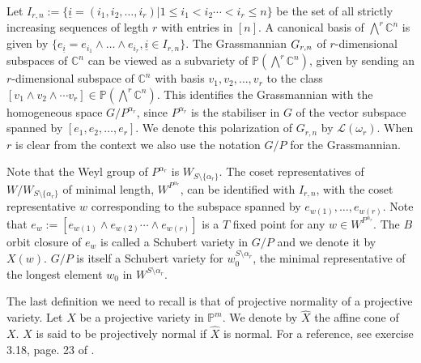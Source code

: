 Let $I_{r,n}:=\{{\underline{i}} =(i_1,i_2,\ldots,i_r) |  1\leq i_1 < i_2 \cdots < i_r \leq n \}$ be the set of all strictly increasing sequences of legth $r$ with entries in $[n]$. 
 A canonical basis of $\bigwedge^r{\mathbb C}^n$ is given by $\{e_{ \underline{i}} = e_{i_1} \wedge \ldots \wedge e_{i_r}, {\underline{i}} \in I_{r,n}\}$. The Grassmannian $G_{{r},{n}}$ of $r$-dimensional subspaces of ${\mathbb C}^n$ can be viewed as a subvariety of ${\mathbb P}(\bigwedge^r {\mathbb C}^n)$,
given by sending an $r$-dimensional
subspace of ${\mathbb C}^n$ with basis $v_1,v_2,\ldots,v_r$ to the class $[v_1 \wedge v_2 \wedge \cdots v_r] \in {\mathbb P}(\bigwedge^r {\mathbb C}^n)$. This identifies the Grassmannian  with the homogeneous space  $G/P^{\alpha_r}$, since  $P^{\alpha_r}$ is the  stabiliser in $G$ of the vector subspace spanned by $[e_1,e_2, \ldots,e_r]$. We denote this polarization of $G_{r,n}$ by ${\mathcal L}(\omega_r)$. When $r$ is clear from the context we also use the notation $G/P$ for the Grassmannian.

Note that the Weyl group of  $P^{\alpha_r}$ is  $W_{S\setminus \{\alpha_r\}}$. The coset representatives of $W/W_{S\setminus \{\alpha_r\}}$  of minimal length, $W^{P^{\alpha_r}}$, can be identified with $I_{r,n}$, with the coset representative $w$ corresponding to the subspace spanned by ${e_{w(1)},\ldots,e_{w(r)}}$. Note that $e_w := [e_{w(1)} \wedge e_{w(2)} \cdots \wedge e_{w(r)}]$  is a $T$ fixed point for any $w \in W^{P^{\alpha_r}}$. The $B$ orbit closure of $e_{w}$ is called a Schubert variety in $G/P$ and we denote it
by $X(w)$. $G/P$ is itself a Schubert variety for $w_0^{S \setminus \alpha_r}$, the minimal representative of the longest element $w_0$ in $W^{S \setminus \alpha_r}$.   

The last definition we need to recall is that of projective normality of a projective variety.
Let $X$ be a projective variety in $\mathbb{P}^{m}.$ We denote by $\hat{X}$ the affine cone of $X.$  $X$ is said to be projectively normal if $\hat{X}$ is normal. For a reference, see exercise 3.18, page. 23 of \cite{hart1977alggeo}.  

